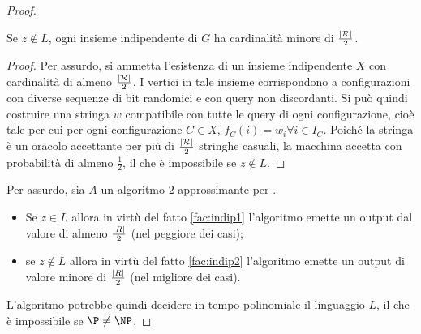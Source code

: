\begin{proof}
	\begin{fact}\label{fac:indip2}
		Se $z\notin L$, ogni insieme indipendente di $G$ ha cardinalità minore di $\frac{| \mathcal R |}{2}$.
	\end{fact}
	\begin{proof}
		Per assurdo, si ammetta l'esistenza di un insieme indipendente $X$ con cardinalità di almeno $\frac{| \mathcal R |}{2}$.
		I vertici in tale insieme corrispondono a configurazioni con diverse sequenze di bit randomici e con query non discordanti.
		Si può quindi costruire una stringa $w$ compatibile con tutte le query di ogni configurazione, cioè tale per cui per ogni configurazione $C\in X$, $f_C(i)=w_i\forall i\in I_C$.
		Poiché la stringa è un oracolo accettante per più di $\frac{| \mathcal R |}{2}$ stringhe casuali, la macchina accetta con probabilità di almeno $\frac12$, il che è impossibile se $z\notin L$.
	\end{proof}

	Per assurdo, sia $A$ un algoritmo $2$-approssimante per \IndependentSet.
	\begin{itemize}
		\item Se $z\in L$ allora in virtù del fatto \ref{fac:indip1} l'algoritmo emette un output dal valore di almeno $\frac{| R |}{2}$ (nel peggiore dei casi);
		\item se $z\notin L$ allora in virtù del fatto \ref{fac:indip2} l'algoritmo emette un output di valore minore di $\frac{| R |}{2}$ (nel migliore dei casi).
	\end{itemize}
	L'algoritmo potrebbe quindi decidere in tempo polinomiale il linguaggio $L$, il che è impossibile se $\P\neq\NP$.
\end{proof}
